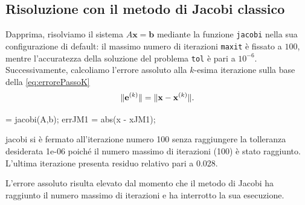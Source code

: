 \subsection{Risoluzione con il metodo di Jacobi classico}
Dapprima, risolviamo il sistema $A\mathbf{x}=\mathbf{b}$ mediante la funzione \lstinline{jacobi} nella sua configurazione di default:
il massimo numero di iterazioni \lstinline{maxit} \`e fissato a $\num{100}$, mentre l'accuratezza della soluzione del problema \lstinline{tol} \`e pari a ${10}^{-6}$.\newline
Successivamente, calcoliamo l'errore assoluto alla $k$-esima iterazione sulla base della \eqref{eq:errorePassoK}
\begin{equation*}
\lVert\mathbf{e}^{(k)}\rVert = \lVert\mathbf{x} - \mathbf{x}^{(k)}\rVert.
\end{equation*}
\begin{matlabcode}
     = jacobi(A,b);
    errJM1 = abs(x - xJM1);
\end{matlabcode}
\begin{matlaboutput}
    jacobi si è fermato all'iterazione numero 100 senza
    raggiungere la tolleranza desiderata 1e-06 poiché il
    numero massimo di iterazioni (100) è stato raggiunto.
    L'ultima iterazione presenta residuo relativo 
    pari a 0.028.
\end{matlaboutput}
L'errore assoluto risulta elevato dal momento che il metodo di Jacobi ha raggiunto il numero massimo di iterazioni e ha interrotto la sua esecuzione.

